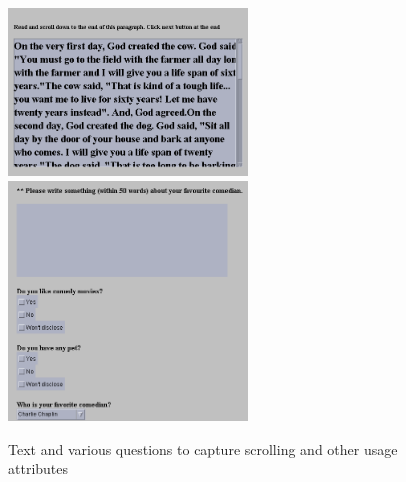 \begin{figure}
\centering
\includegraphics[width=2.5in,clip,keepaspectratio]{Chapters/figures/scrollText.png}
\includegraphics[width=2.5in,clip,keepaspectratio]{Chapters/figures/survey.png}
\caption{Text and various questions to capture scrolling and other usage attributes}
\label{Optional2 }
\end{figure}

